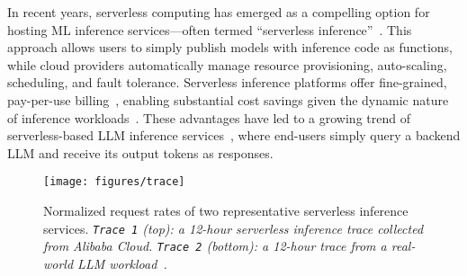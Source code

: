 In recent years, serverless computing has emerged as a compelling option for hosting ML inference services---often termed ``serverless inference''~\cite
{yang_infless_2022,yu_gillis_icdcs,zhang_mark:_2019, ali2022optimizing_serverless_inference, ali_batch_nodate, hong2024optimus, fu_serverlessllm_2024, romero_infaas_nodate, wang_faasnet_nodate}.
This approach allows users to simply publish models with inference code as functions, while cloud providers automatically manage resource provisioning, auto-scaling, scheduling, and fault tolerance. 
Serverless inference platforms offer fine-grained, pay-per-use billing~\cite
{aws_lambda,azurefunc,alibaba_serverless_gpu}, enabling substantial cost savings given the dynamic nature of inference workloads~\cite
{shen_nexus_2019,zhang_shepherd_nodate,gujarati_serving_2020,han_microsecond-scale_2022,lee_pretzel,kosaian_parity_2019,romero_infaas_nodate,
crankshaw_clipper,choi_serving_2022}.  
These advantages have led to a growing trend of serverless-based LLM inference services~\cite{fu_serverlessllm_2024,hf_serverless,together_ai}, where end-users simply query a backend LLM and receive its output tokens as responses. 


\begin{figure}
\vspace{-8pt} 
    \centering
    \texttt{[image: figures/trace]}
    \vspace{-10pt}
    \caption{Normalized request rates of two representative serverless inference services.
    \textit{\textmd{\texttt{Trace 1} (top): a 12-hour serverless inference trace collected from Alibaba Cloud. \texttt{Trace 2} (bottom): a 12-hour trace from a real-world LLM workload~\cite{burstGPT_arxiv24}.}} 
    }
    \label{fig:serverless_trace}
    \vspace{-5pt}
\end{figure}

